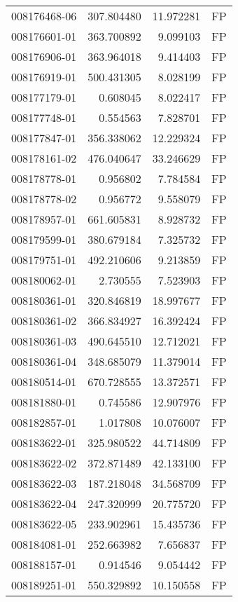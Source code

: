 \begin{tabular}{lrrl}
008176468-06 &  307.804480 &    11.972281 &   FP \\
008176601-01 &  363.700892 &     9.099103 &   FP \\
008176906-01 &  363.964018 &     9.414403 &   FP \\
008176919-01 &  500.431305 &     8.028199 &   FP \\
008177179-01 &    0.608045 &     8.022417 &   FP \\
008177748-01 &    0.554563 &     7.828701 &   FP \\
008177847-01 &  356.338062 &    12.229324 &   FP \\
008178161-02 &  476.040647 &    33.246629 &   FP \\
008178778-01 &    0.956802 &     7.784584 &   FP \\
008178778-02 &    0.956772 &     9.558079 &   FP \\
008178957-01 &  661.605831 &     8.928732 &   FP \\
008179599-01 &  380.679184 &     7.325732 &   FP \\
008179751-01 &  492.210606 &     9.213859 &   FP \\
008180062-01 &    2.730555 &     7.523903 &   FP \\
008180361-01 &  320.846819 &    18.997677 &   FP \\
008180361-02 &  366.834927 &    16.392424 &   FP \\
008180361-03 &  490.645510 &    12.712021 &   FP \\
008180361-04 &  348.685079 &    11.379014 &   FP \\
008180514-01 &  670.728555 &    13.372571 &   FP \\
008181880-01 &    0.745586 &    12.907976 &   FP \\
008182857-01 &    1.017808 &    10.076007 &   FP \\
008183622-01 &  325.980522 &    44.714809 &   FP \\
008183622-02 &  372.871489 &    42.133100 &   FP \\
008183622-03 &  187.218048 &    34.568709 &   FP \\
008183622-04 &  247.320999 &    20.775720 &   FP \\
008183622-05 &  233.902961 &    15.435736 &   FP \\
008184081-01 &  252.663982 &     7.656837 &   FP \\
008188157-01 &    0.914546 &     9.054442 &   FP \\
008189251-01 &  550.329892 &    10.150558 &   FP \\

\end{tabular}
